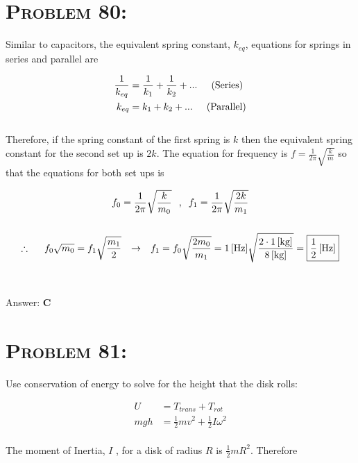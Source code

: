 \documentclass{article}
\begin{document}

\section{\textsc{Problem 80:}} Similar to capacitors, the equivalent spring constant, $k_{eq}$, equations for springs in series and parallel are

\begin{align}
\frac{1}{k_{eq}} &= \frac{1}{k_{1}} + \frac{1}{k_{2}} +... \hspace{.2in} \text{(Series)}\\
k_{eq} &= k_{1} + k_{2} + ... \hspace{.2in} \text{(Parallel)}
\end{align}
\\
Therefore, if the spring constant of the first spring is $k$ then the equivalent spring constant for the second set up is $2k$. The equation for frequency is $f = \frac{1}{2 \pi} \sqrt{\frac{k}{m}}$ so that the equations for both set ups is

\begin{gather}
f_{0} = \frac{1}{2 \pi} \sqrt{\frac{k}{m_{0}}} \hspace{.1in} \text{,} \hspace{.1in}f_{1} = \frac{1}{2 \pi} \sqrt{\frac{2k}{m_{1}}}\nonumber\\
\nonumber\\
\therefore \hspace{.2in}  f_{0}\sqrt{m_{0}} = f_{1} \sqrt{\frac{m_{1}}{2}} \hspace{.1in} \rightarrow  \hspace{.1in} f_{1} = f_{0} \sqrt{\frac{2 m_{0}}{m_{1}}} =  \unit[1]{[Hz]} \sqrt{\frac{2 \cdot \unit[1]{[kg]}}{\unit[8]{[kg]}}} = \boxed{\unit[\frac{1}{2}]{[Hz]}}\nonumber
\end{gather}
\\\\
Answer: \textbf{\textcolor{ProcessBlue}C}\\


\section{\textsc{Problem 81:}} Use conservation of energy to solve for the height that the disk rolls:

\begin{align}
U &= T_{trans} + T_{rot}\\
mgh &= \frac{1}{2} m v^{2} + \frac{1}{2} I \omega^{2}
\end{align}
\\
The moment of Inertia, $I$ , for a disk of radius $R$ is $\frac{1}{2} m R^2$. Therefore
\end{document}
